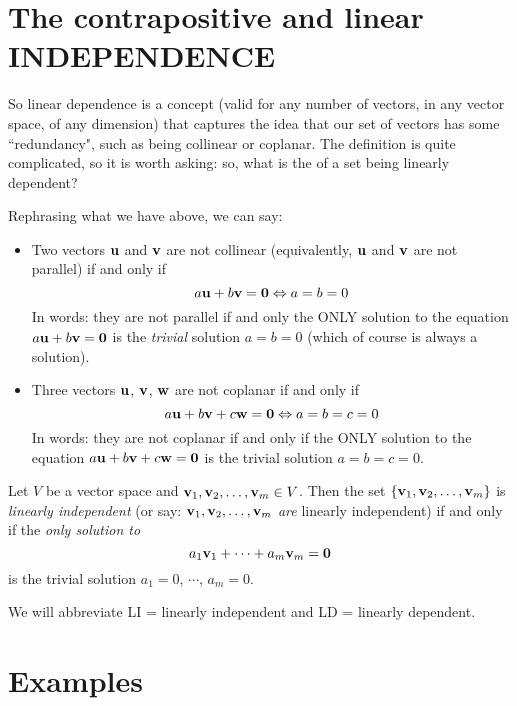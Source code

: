 \section{The contrapositive and linear INDEPENDENCE}

So linear dependence is a concept (valid for any number of vectors, in any vector space, of any dimension) that captures the idea that our set of vectors has some ``redundancy", such as being collinear or coplanar.  The definition is quite complicated, so it is worth asking: so, what is the  of a set being linearly dependent?
 
Rephrasing what we have above, we can say:
\begin{itemize}
\item Two vectors $\mathbf{u}$ and $\mathbf{v}$ are not collinear (equivalently, 
$\mathbf{u}$ and $\mathbf{v}$ are not parallel) if and only if
$$
a\mathbf{u} + b\mathbf{v} = \mathbf{0} \Leftrightarrow a=b=0
$$
In words:  they are not parallel if and only the ONLY solution to
the equation $a\mathbf{u} + b\mathbf{v} = \mathbf{0}$ is the \emph{trivial} solution
$a=b=0$ (which of course is always a solution).

\item Three vectors $\mathbf{u}$, $\mathbf{v}$, $\mathbf{w}$ are not coplanar if and only if
$$
a\mathbf{u} + b\mathbf{v} + c\mathbf{w} = \mathbf{0} \Leftrightarrow a=b=c=0
$$
In words:  they are not coplanar if and only if the ONLY solution to
the equation $a\mathbf{u} + b\mathbf{v} + c\mathbf{w} = \mathbf{0}$ is the trivial solution $a=b=c=0$.
\end{itemize}


\begin{definition}  Let $V$ be a vector space and
$\mathbf{v}_1, \mathbf{v}_2, \ldots, \mathbf{v}_m \in V$.  Then the set 
$\{\mathbf{v}_1, \mathbf{v}_2, \ldots, \mathbf{v}_m\}$ is \emph{linearly independent}
(or say:  $\mathbf{v}_1, \mathbf{v}_2, \ldots, \mathbf{v}_m$ \emph{are} linearly independent)
if and only if the \emph{only solution to}
$$
a_1\mathbf{v}_1 + \cdots + a_m\mathbf{v}_m = \mathbf{0}
$$
is the trivial solution $a_1=0$, $\cdots$, $a_m=0$.
\end{definition}


We will abbreviate LI = linearly independent and LD = linearly dependent.

\section{Examples}

